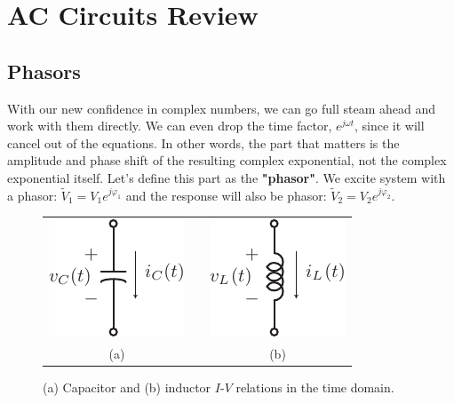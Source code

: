 \section{AC Circuits Review}
\subsection{Phasors}
With our new confidence in complex numbers, we can go full steam ahead and work with them directly.  We can even drop the time factor, $e^{j\omega t}$, since it will cancel out of the equations.  In other words, the part that matters is the amplitude and phase shift of the resulting complex exponential, not the complex exponential itself.  Let's define this part as the \textbf{"phasor"}.
We excite system with a phasor: ${\tilde V_1} = {V_1}{e^{j{\varphi _1}}}$ and the response  will also be phasor: ${\tilde V_2} = {V_2}{e^{j{\varphi _2}}}$.   
\begin{figure}[H]
\centering
\begin{tabular}{ccc}
\includegraphics[width=.25\columnwidth]{mod1_3_3_cap} & \hspace{1cm} &
\includegraphics[width=.25\columnwidth]{mod1_3_4_ind}\\
(a) & & (b)\\
\end{tabular}
\caption{(a) Capacitor and (b) inductor  $I$-$V$ relations in the time domain.}
\label{fig:lcphasor}
\end{figure}
